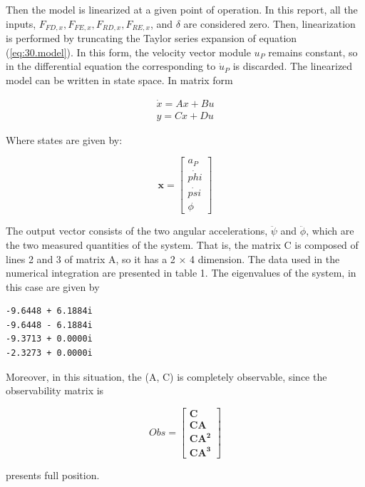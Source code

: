 \documentclass[sublist,a4paper,twoside,11pt]{article}
\begin{document}
Then the model is linearized at a given point of operation. In this report, all the inputs, $F_{FD,x}, F_{FE,x}, F_{RD,x}, F_{RE,x}$, and $\delta$ are considered zero. Then, linearization is performed by truncating the Taylor series expansion of equation (\ref{eq:30.model}). In this form, the velocity vector module $u_P$ remains constant, so in the differential equation the corresponding to $\dot{u}_P$ is discarded.
The linearized model can be written in state space. In matrix form


\begin{eqnarray}\label{eq:31.linearised.model.state.space}
\dot{x} = Ax + Bu \nonumber\\
y = Cx + Du
\end{eqnarray}

Where states are given by:

\begin{equation}\mathbf{x}=
\begin{bmatrix}
a_P\\
\dot{phi}\\
\dot{psi}\\
\phi
\end{bmatrix}
\end{equation}

The output vector consists of the two angular accelerations, $\ddot{\psi}$ and $\ddot{\phi}$, which are the two measured quantities of the system. That is, the matrix C is composed of lines 2 and 3 of matrix A, so it has a 2 × 4 dimension.
The data used in the numerical integration are presented in table 1. The eigenvalues of the system, in this case are given by

\begin{verbatim}
-9.6448 + 6.1884i
-9.6448 - 6.1884i
-9.3713 + 0.0000i
-2.3273 + 0.0000i
\end{verbatim}

Moreover, in this situation, the (A, C) is completely observable, since the observability matrix is 

\begin{equation}Obs=
\begin{bmatrix}
\mathbf{C}\\
\mathbf{CA}\\
\mathbf{CA^2}\\
\mathbf{CA^3}
\end{bmatrix}
\end{equation}


presents full position.
\end{document}
